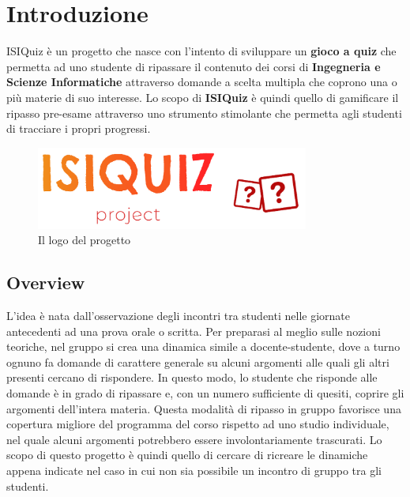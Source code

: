 

\chapter{Introduzione}
ISIQuiz è un progetto che nasce con l'intento di sviluppare un \textbf{gioco a quiz} che permetta ad uno studente di ripassare il contenuto dei corsi di \textbf{Ingegneria e Scienze Informatiche} attraverso domande a scelta multipla che coprono una o più materie di suo interesse. Lo scopo di \textbf{ISIQuiz} è quindi quello di gamificare il ripasso pre-esame attraverso uno strumento stimolante che permetta agli studenti di tracciare i propri progressi.
\begin{figure}[H]
    \label{fig:Logo}
    \centering
    \includegraphics[width=0.8\textwidth]{Extra/ISIQuizLogoLineTransparent.png}
    \caption{Il logo del progetto}
\end{figure}

\section{Overview}
L'idea è nata dall'osservazione degli incontri tra studenti nelle giornate antecedenti ad una prova orale o scritta. Per preparasi al meglio sulle nozioni teoriche, nel gruppo si crea una dinamica simile a docente-studente, dove a turno ognuno fa domande di carattere generale su alcuni argomenti alle quali gli altri presenti cercano di rispondere. In questo modo, lo studente che risponde alle domande è in grado di ripassare e, con un numero sufficiente di quesiti, coprire gli argomenti dell'intera materia. Questa modalità di ripasso in gruppo favorisce una copertura migliore del programma del corso rispetto ad uno studio individuale, nel quale alcuni argomenti potrebbero essere involontariamente trascurati.
Lo scopo di questo progetto è quindi quello di cercare di ricreare le dinamiche appena indicate nel caso in cui non sia possibile un incontro di gruppo tra gli studenti.


